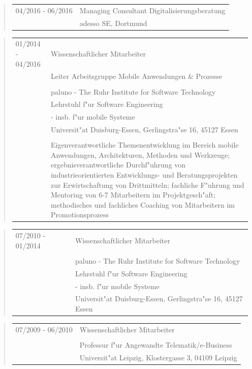 	\begin{quote}
		\begin{tabular}{p{4cm}l}
			04/2016 - 06/2016&Managing Consultant Digitalisierungsberatung\\
			&adesso SE, Dortmund\\
		\end{tabular}
	\end{quote}
	\begin{quote}
		\begin{tabular}{p{4cm}l}
			01/2014 - 04/2016&Wissenschaftlicher Mitarbeiter\\
			&Leiter Arbeitsgruppe Mobile Anwendungen \& Prozesse\\\\
			&paluno - The Ruhr Institute for Software Technology\\
			&Lehrstuhl f"ur Software Engineering\\
			&\qquad - insb. f"ur mobile Systeme\\
			&Universit"at Duisburg-Essen, Gerlingstra"se 16, 45127 Essen\\
			\\
			&\begin{minipage}{10cm}
				Eigenverantwortliche Themenentwicklung im Bereich mobile Anwendungen, Architekturen, Methoden und Werkzeuge; ergebnisverantwortliche Durchf"uhrung von industrieorientierten Entwicklungs- und Beratungsprojekten zur Erwirtschaftung von Drittmitteln; fachliche F"uhrung und Mentoring von 6-7 Mitarbeitern im Projektgesch"aft; methodisches und fachliches Coaching von Mitarbeitern im Promotionsprozess
			\end{minipage}
		\end{tabular}
	\end{quote}
	\begin{quote}
		\begin{tabular}{p{4cm}l}
			07/2010 - 01/2014&Wissenschaftlicher Mitarbeiter\\\\
			&paluno - The Ruhr Institute for Software Technology\\
			&Lehrstuhl f"ur Software Engineering\\
			&\qquad - insb. f"ur mobile Systeme\\
			&Universit"at Duisburg-Essen, Gerlingstra"se 16, 45127 Essen
		\end{tabular}
	\end{quote}
	\begin{quote}
		\begin{tabular}{p{4cm}l}
			07/2009 - 06/2010&Wissenschaftlicher Mitarbeiter\\\\
			&Professur f"ur Angewandte Telematik/e-Business\\   
			&Universit"at Leipzig, Klostergasse 3, 04109 Leipzig
			\end{tabular}
		\end{quote}
